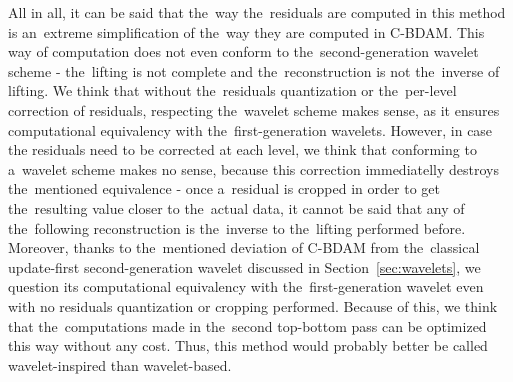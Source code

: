 All in all, it can be said that the~way the~residuals are computed in this method is an~extreme simplification of the~way they are computed in C-BDAM. This way of computation does not even conform to the~second-generation wavelet scheme - the~lifting is not complete and the~reconstruction is not the~inverse of lifting. We think that without the~residuals quantization or the~per-level correction of residuals, respecting the~wavelet scheme makes sense, as it ensures computational equivalency with the~first-generation wavelets. However, in case the residuals need to be corrected at each level, we think that conforming to a~wavelet scheme makes no sense, because this correction immediatelly destroys the~mentioned equivalence - once a~residual is cropped in order to get the~resulting value closer to the~actual data, it cannot be said that any of the~following reconstruction is the~inverse to the~lifting performed before. Moreover, thanks to the~mentioned deviation of C-BDAM from the~classical update-first second-generation wavelet discussed in Section~\ref{sec:wavelets}, we question its computational equivalency with the~first-generation wavelet even with no residuals quantization or cropping performed. Because of this, we think that the~computations made in the~second top-bottom pass can be optimized this way without any cost. Thus, this method would probably better be called wavelet-inspired than wavelet-based.